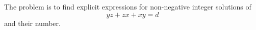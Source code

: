 \begin{proposition}\label{eq:026}
    The problem is to find explicit expressions for non-negative integer solutions of
\[
    yz+zx+xy=d
\]
    and their number.
\end{proposition}
